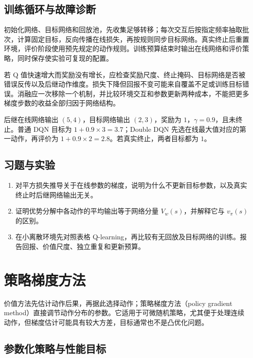 \documentclass[UTF8,12pt,a4paper,fontset=fandol]{ctexbook}
\begin{document}
\section{训练循环与故障诊断}

初始化网络、目标网络和回放池，先收集足够转移；每次交互后按指定频率抽取批次，计算固定目标，反向传播在线损失，再按规则同步目标网络。真实终止后重置环境，评价阶段使用预先规定的动作规则。训练预算结束时输出在线网络和评价策略，同时保存使实验可复现的配置。

若 Q 值快速增大而奖励没有增长，应检查奖励尺度、终止掩码、目标网络是否被错误反传以及后继动作维度。损失下降但回报不变可能来自覆盖不足或训练目标错误。消融应一次移除一个机制，并比较环境交互和参数更新两种成本，不能把更多梯度步数的收益全部归因于网络结构。

\begin{example}[普通与双重目标]
后继在线网络输出 $(5,4)$，目标网络输出 $(2,3)$，奖励为 $1$，$\gamma=0.9$，且未终止。普通 DQN 目标为 $1+0.9\times3=3.7$；Double DQN 先选在线最大值对应的第一动作，再评价为 $1+0.9\times2=2.8$。若真实终止，两者目标都为 $1$。
\end{example}

\section{习题与实验}
\begin{enumerate}
\item 对平方损失推导关于在线参数的梯度，说明为什么不更新目标参数，以及真实终止时后继网络输出无关。
\item 证明优势分解中各动作的平均输出等于网络分量 $V_w(s)$，并解释它与 $v_\pi(s)$ 的区别。
\item 在小离散环境先对照表格 Q-learning，再比较有无回放及目标网络的训练。报告回报、价值尺度、独立重复和更新预算。
\end{enumerate}

\chapter{策略梯度方法}
\label{ch:rl-policy-gradient}

价值方法先估计动作后果，再据此选择动作；策略梯度方法（policy gradient method）直接调节动作分布的参数。它适用于可微随机策略，尤其便于处理连续动作，但梯度估计可能具有较大方差，目标通常也不是凸优化问题。

\section{参数化策略与性能目标}
\end{document}
